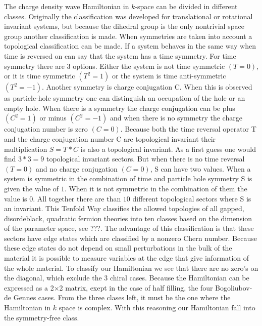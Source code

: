 \documentclass[letterpaper, 10 pt, conference]{ieeeconf}  %
\begin{document}
The charge density wave Hamiltonian in $k$-space can be divided in different
classes. Originally the classification was developed for translational or
rotational invariant systems, but because the dihedral group is the only
nontrivial space group another classification is made. When symmetries are taken
into account a topological classification can be made. If a system behaves in
the same way when time is reversed on can say that the system has a time
symmetry. For time symmetry there are 3 options. Either the system is not time
symmetric $(T=0)$, or it is time symmetric $(T^2=1)$ or the system is time
anti-symmetric  $(T^2=-1)$.  Another symmetry  is charge conjugation C. When
this is observed as particle-hole symmetry one can distinguish an occupation of
the hole or an empty hole. When there is a symmetry the  charge conjugation can
be plus $(C^2=1)$ or minus $(C^2=-1)$ and when there is no symmetry  the charge
conjugation number  is zero $(C=0)$.  Because both the time reversal operator T
and the charge conjugation number C are topological invariant their
multiplication $S=T * C $ is also a topological invariant. As a first guess one
would find $3 * 3 = 9 $ topological invariant sectors. But when there is no time
reversal $(T=0)$ and no charge conjugation $(C=0)$, S can have two values. When
a system is symmetric in the combination of time and particle hole symmetry S is
given the value of $1$. When it is not symmetric in the combination of them the
value is $0$. All together there are than $10$ different topological sectors
where S is an invariant. This Tenfold Way classifies the allowed topologies of
all gapped, disordeblack, quadratic fermion theories into ten classes based on the
dimension of the parameter space, see ???. The advantage of this classification is that
these sectors have edge states which are classified by a nonzero Chern number.
Because these edge states do not
depend on small perturbations in the bulk of the material it is possible to
measure variables at the edge that give information of the whole material.
To classify our Hamiltonian we see that there are no zero's on the diagonal,
which exclude the 3 chiral cases. Because the Hamiltonian can be expressed as a 2$\times$2
 matrix, exept in the case of half filling, the four Bogoliubov-de Gennes cases. From the three
 clases left, it must be the one where the Hamiltonian in $k$ space is complex.
 With this reasoning our Hamiltonian fall into the symmetry-free class.


%
\end{document}
